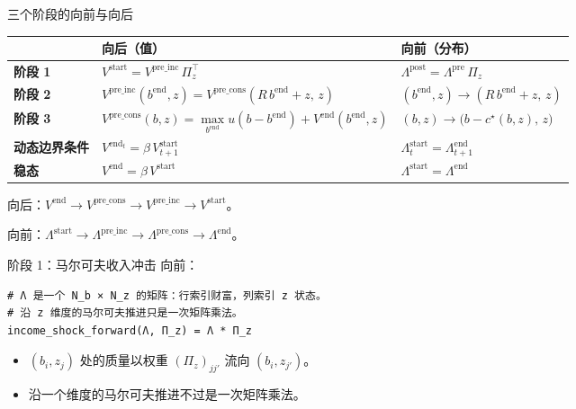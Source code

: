 \documentclass[10pt,aspectratio=169]{beamer}
\begin{document}
\begin{frame}{三个阶段的向前与向后}
  \footnotesize
  \setlength{\tabcolsep}{6pt}
  \renewcommand{\arraystretch}{1.45}
  \begin{tabular}{@{}l l l@{}}
  \toprule
  & \textbf{向后}（值） & \textbf{向前}（分布） \\
  \midrule
  \textbf{阶段 1}    & $V^{\mathrm{start}} = V^{\mathrm{pre\_inc}}\, \Pi_z^\top$
                      & $\Lambda^{\mathrm{post}} = \Lambda^{\mathrm{pre}}\, \Pi_z$ \\
  \textbf{阶段 2}    & $V^{\mathrm{pre\_inc}}(b^{\mathrm{end}}, z) = V^\text{pre\_cons}(R\, b^{\mathrm{end}} + z,\, z)$
                      & $(b^{\mathrm{end}}, z) \to (R\, b^{\mathrm{end}} + z,\, z)$ \\
  \textbf{阶段 3}    & $V^\text{pre\_cons}(b, z) = \max\limits_{b^{\mathrm{end}}} u(b - b^{\mathrm{end}}) + V^{\mathrm{end}}(b^{\mathrm{end}}, z)$
                      & $(b, z) \to \big(b - c^\star(b, z),\, z\big)$ \\
  \midrule
  \textbf{动态边界条件}   & $V^{\mathrm{end}_t} = \beta\, V^{\mathrm{start}}_{t+1}$
                      & $\Lambda^\text{start}_t = \Lambda^\text{end}_{t+1}$ \\
  \textbf{稳态}   & $V^{\mathrm{end}} = \beta\, V^{\mathrm{start}}$
                      & $\Lambda^\text{start} = \Lambda^\text{end}$ \\
  \bottomrule
  \end{tabular}

  \vspace{0.8em}

  \footnotesize
  向后：$V^{\mathrm{end}} \to V^\text{pre\_cons} \to V^{\mathrm{pre\_inc}} \to V^{\mathrm{start}}$。

  向前：$\Lambda^\text{start} \to \Lambda^\text{pre\_inc} \to \Lambda^\text{pre\_cons} \to \Lambda^\text{end}$。
\end{frame}

\begin{frame}[fragile]{阶段 1：马尔可夫收入冲击}
  向前：
  \begin{lstlisting}
# Λ 是一个 N_b × N_z 的矩阵：行索引财富，列索引 z 状态。
# 沿 z 维度的马尔可夫推进只是一次矩阵乘法。
income_shock_forward(Λ, Π_z) = Λ * Π_z
  \end{lstlisting}

  \begin{itemize}
    \item $(b_i, z_j)$ 处的质量以权重 $(\Pi_z)_{j j'}$ 流向 $(b_i, z_{j'})$。
    \item 沿一个维度的马尔可夫推进不过是一次矩阵乘法。
  \end{itemize}
\end{frame}
\end{document}
